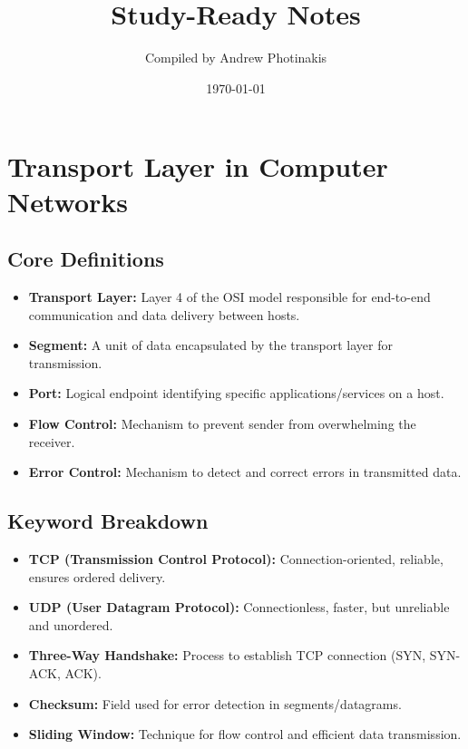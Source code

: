 \documentclass[12pt]{article}
\title{\TOPICTITLE\\\large Study-Ready Notes}
\author{Compiled by Andrew Photinakis}
\date{\today}
\begin{document}
\maketitle
\tableofcontents
\newpage

\section{Transport Layer in Computer Networks}

\subsection{Core Definitions}
\begin{itemize}
    \item \textbf{Transport Layer:} Layer 4 of the OSI model responsible for end-to-end communication and data delivery between hosts.
    \item \textbf{Segment:} A unit of data encapsulated by the transport layer for transmission.
    \item \textbf{Port:} Logical endpoint identifying specific applications/services on a host.
    \item \textbf{Flow Control:} Mechanism to prevent sender from overwhelming the receiver.
    \item \textbf{Error Control:} Mechanism to detect and correct errors in transmitted data.
\end{itemize}

\subsection{Keyword Breakdown}
\begin{itemize}
    \item \textbf{TCP (Transmission Control Protocol):} Connection-oriented, reliable, ensures ordered delivery.
    \item \textbf{UDP (User Datagram Protocol):} Connectionless, faster, but unreliable and unordered.
    \item \textbf{Three-Way Handshake:} Process to establish TCP connection (SYN, SYN-ACK, ACK).
    \item \textbf{Checksum:} Field used for error detection in segments/datagrams.
    \item \textbf{Sliding Window:} Technique for flow control and efficient data transmission.
\end{itemize}
\end{document}
